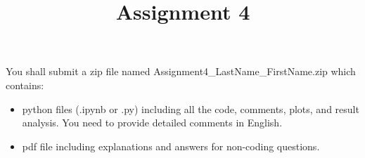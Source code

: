 \documentclass{exam}
\title{Assignment 4}
\date{}
\begin{document}
\maketitle
\thispagestyle{headandfoot}

\begin{center}
  {}
\end{center}
\vspace{.5cm}
\vspace{10pt}
You shall submit a zip file named Assignment4\_LastName\_FirstName.zip which contains:

\begin{itemize}
  \item python files (.ipynb or .py) including all the code, comments, plots, and result analysis. You need to provide detailed comments in English.
   \item pdf file including explanations and answers for non-coding questions. 
\end{itemize}
\vspace{10pt}
\end{document}
